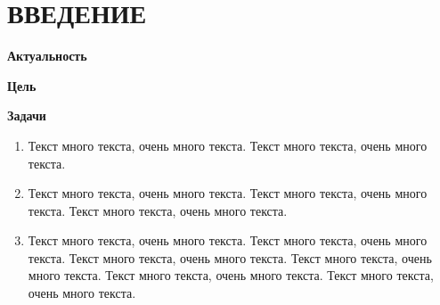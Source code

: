 \chapter*{ВВЕДЕНИЕ}

\textbf{Актуальность}

\textbf{Цель}

\textbf{Задачи}
\begin{enumerate}
\item Текст много текста, очень много текста. Текст много текста, очень много текста.
\item Текст много текста, очень много текста. Текст много текста, очень много текста. Текст много текста, очень много текста.
\item Текст много текста, очень много текста. Текст много текста, очень много текста. Текст много текста, очень много текста. Текст много текста, очень много текста. Текст много текста, очень много текста. Текст много текста, очень много текста.
\end{enumerate}

